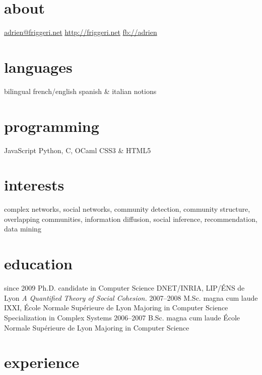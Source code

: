 \documentclass{cv}
\begin{document}

\begin{aside}
  \section{about}
    \href{mailto:adrien@friggeri.net}{adrien@friggeri.net}
    \href{http://friggeri.net}{http://friggeri.net}
    \href{http://facebook.com/adrien}{fb://adrien}
  \section{languages}
    bilingual french/english
    spanish \& italian notions
  \section{programming}
    JavaScript
    Python, C, OCaml
    CSS3 \& HTML5
\end{aside}

\section{interests}

complex networks, social networks, community detection, community structure,
overlapping communities, information diffusion, social inference, 
recommendation, data mining

\section{education}

\begin{entrylist}
  \entry
    {since 2009}
    {Ph.D. {\normalfont candidate in Computer Science}}
    {DNET/INRIA, LIP/ÉNS de Lyon}
    {\emph{A Quantified Theory of Social Cohesion.}}
  \entry
    {2007–2008}
    {M.Sc. magna cum laude}
    {IXXI, École Normale Supérieure de Lyon}
    {Majoring in Computer Science\\
    Specialization in Complex Systems}
  \entry
    {2006–2007}
    {B.Sc. magna cum laude}
    {École Normale Supérieure de Lyon}
    {Majoring in Computer Science}
\end{entrylist}

\section{experience}
\end{document}
